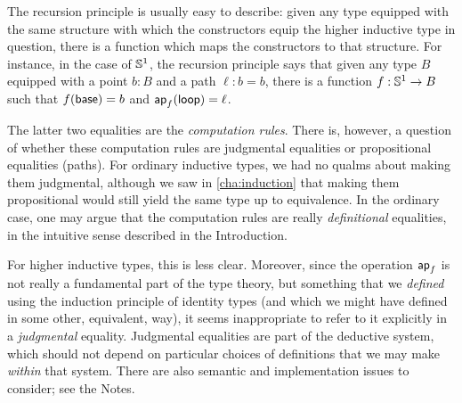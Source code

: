 %
%
The recursion principle is usually easy to describe: given any type equipped with the same structure with which the constructors equip the higher inductive type in question, there is a function which maps the constructors to that structure.
For instance, in the case of $\mathbb{S}^1$, the recursion principle says that given any type $B$ equipped with a point $b:B$ and a path $\ell:b=b$, there is a function $f:\mathbb{S}^1\to B$ such that $f(\mathsf{base})=b$ and $\mathsf{ap}_{f} (\mathsf{loop}) = \ell$.

%
%
The latter two equalities are the \emph{computation rules}.
%
%
There is, however, a question of whether these computation rules are judgmental equalities or propositional equalities (paths).
For ordinary inductive types, we had no qualms about making them judgmental, although we saw in \autoref{cha:induction} that making them propositional would still yield the same type up to equivalence.
In the ordinary case, one may argue that the computation rules are really \emph{definitional} equalities, in the intuitive sense described in the Introduction.

%
For higher inductive types, this is less clear. %
Moreover, since the operation $\mathsf{ap}_{f}$ is not really a fundamental part of the type theory, but something that we \emph{defined} using the induction principle of identity types (and which we might have defined in some other, equivalent, way), it seems inappropriate to refer to it explicitly in a \emph{judgmental} equality.
Judgmental equalities are part of the deductive system, which should not depend on particular choices of definitions that we may make \emph{within} that system.
There are also semantic and implementation issues to consider; see the Notes.

